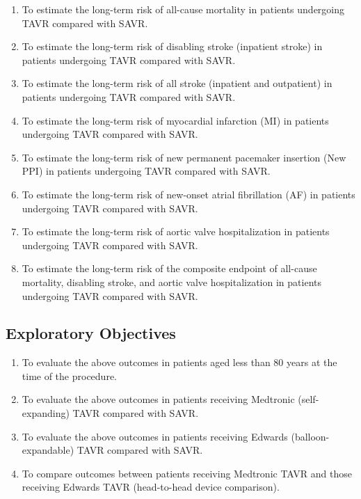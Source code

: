 \documentclass[
  12pt,
]{article}
\providecommand{\tightlist}{%
  \setlength{\itemsep}{0pt}\setlength{\parskip}{0pt}}
\begin{document}
\begin{enumerate}
\def\labelenumi{\arabic{enumi}.}
\tightlist
\item
  To estimate the long-term risk of all-cause mortality in patients
  undergoing TAVR compared with SAVR.
\item
  To estimate the long-term risk of disabling stroke (inpatient stroke)
  in patients undergoing TAVR compared with SAVR.
\item
  To estimate the long-term risk of all stroke (inpatient and
  outpatient) in patients undergoing TAVR compared with SAVR.
\item
  To estimate the long-term risk of myocardial infarction (MI) in
  patients undergoing TAVR compared with SAVR.
\item
  To estimate the long-term risk of new permanent pacemaker insertion
  (New PPI) in patients undergoing TAVR compared with SAVR.
\item
  To estimate the long-term risk of new-onset atrial fibrillation (AF)
  in patients undergoing TAVR compared with SAVR.
\item
  To estimate the long-term risk of aortic valve hospitalization in
  patients undergoing TAVR compared with SAVR.
\item
  To estimate the long-term risk of the composite endpoint of all-cause
  mortality, disabling stroke, and aortic valve hospitalization in
  patients undergoing TAVR compared with SAVR.
\end{enumerate}

\subsection{Exploratory Objectives}\label{exploratory-objectives}

\begin{enumerate}
\def\labelenumi{\arabic{enumi}.}
\tightlist
\item
  To evaluate the above outcomes in patients aged less than 80 years at
  the time of the procedure.
\item
  To evaluate the above outcomes in patients receiving Medtronic
  (self-expanding) TAVR compared with SAVR.
\item
  To evaluate the above outcomes in patients receiving Edwards
  (balloon-expandable) TAVR compared with SAVR.
\item
  To compare outcomes between patients receiving Medtronic TAVR and
  those receiving Edwards TAVR (head-to-head device comparison).
\end{enumerate}
\end{document}
